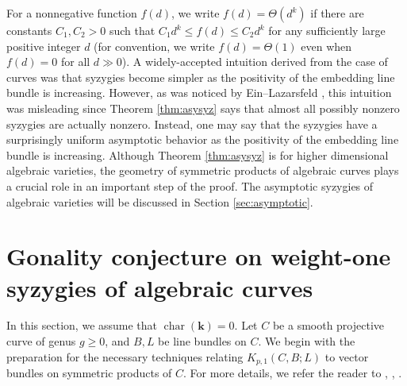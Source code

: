 \documentclass[graybox]{svmult}
\newcommand{\kk}{\mathbf{k}}
\begin{document}
\noindent For a nonnegative function $f(d)$, we write $f(d) = \Theta(d^k)$ if there are constants $C_1, C_2 > 0$ such that $C_1 d^k \leq f(d) \leq C_2 d^k$ for any sufficiently large positive integer $d$ (for convention, we write $f(d) = \Theta(1)$ even when $f(d)=0$ for all $d \gg 0$). A  widely-accepted intuition derived from the case of curves was that syzygies become simpler as the positivity of the embedding line bundle is increasing. However, as was noticed by Ein--Lazarsfeld \cite{EL2}, this intuition was misleading since Theorem \ref{thm:asysyz} says that almost all possibly nonzero syzygies are actually nonzero. Instead, one may say that the syzygies have a surprisingly uniform asymptotic behavior as the positivity of the embedding line bundle is increasing. Although Theorem \ref{thm:asysyz} is for higher dimensional algebraic varieties, the geometry of symmetric products of algebraic curves plays a crucial role in an important step of the proof. The asymptotic syzygies of algebraic varieties will be discussed in Section \ref{sec:asymptotic}.



\section{Gonality conjecture on weight-one syzygies of algebraic curves}\label{sec:gonality}
In this section, we assume that $\operatorname{char}(\kk) = 0$.
Let $C$ be a smooth projective curve of genus $g \geq 0$, and $B,L$ be line bundles on $C$. We begin with the preparation for the necessary techniques relating $K_{p,1}(C,B;L)$ to vector bundles on symmetric products of $C$. For more details, we refer the reader to  \cite{EL2}, \cite{ENP1}, \cite{NP}. 
\end{document}
